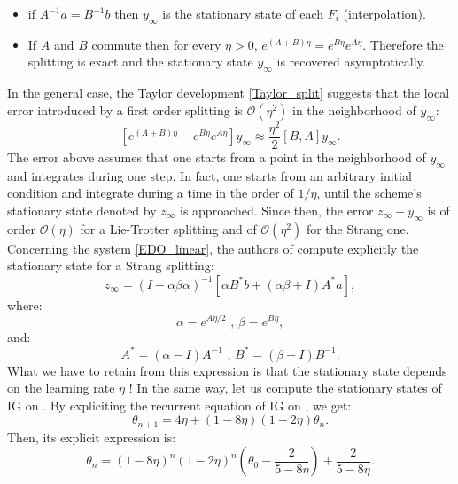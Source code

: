 \begin{itemize}
	\item if $A^{-1}a=B^{-1}b$  then $y_{\infty}$ is the stationary state of each $F_i$ (interpolation).
	\item If $A$ and $B$ commute then for every $\eta>0$, $e^{(A+B)\eta}=e^{B\eta}e^{A\eta}$. Therefore the splitting is exact and the stationary state $y_{\infty}$ is recovered asymptotically. 
\end{itemize}
In the general case, the Taylor development \eqref{Taylor_split} suggests that the local error introduced by a first order splitting is $\mathcal{O}(\eta^2)$ in the neighborhood of $y_{\infty}$:
\begin{equation*}
	\left[e^{(A+B)\eta}-e^{B\eta}e^{A\eta}\right]y_{\infty} \approx \frac{\eta^2}{2}\left[B,A\right]y_{\infty}.
\end{equation*}
The error above assumes that one starts from a point in the neighborhood of $y_{\infty}$ and integrates during one step. In fact, one starts from an arbitrary initial condition and
integrate during a time in the order of $1/\eta$, until the scheme's stationary state denoted by $z_{\infty}$ is approached. Since then, the error $z_{\infty}-y_{\infty}$ is of order $\mathcal{O}(\eta)$ for a Lie-Trotter splitting and of $\mathcal{O}(\eta^2)$ for the Strang one. Concerning the system \eqref{EDO_linear}, the authors of \cite{rebalanced_splitting} compute explicitly the stationary state for a Strang splitting:
\begin{equation*}
	z_{\infty} = (I-\alpha\beta\alpha)^{-1}\left[\alpha B^*b + (\alpha\beta+I)A^*a\right],
\end{equation*}
where:
\begin{equation*}
	\alpha = e^{A\eta/2} \text{ , } \beta = e^{B\eta},
\end{equation*}
and:
\begin{equation*}
	A^* = (\alpha-I)A^{-1} \text{ , } B^* = (\beta-I) B^{-1}.
\end{equation*}
What we have to retain from this expression is that the stationary state depends on the learning rate $\eta$ ! In the same way, let us compute the stationary states of IG on \exOne. By expliciting the recurrent equation of IG on \exOne, we get:
\begin{equation*}
	\theta_{n+1} = 4\eta + (1-8\eta)(1-2\eta)\theta_n.
\end{equation*} 
Then, its explicit expression is:
\begin{equation*}
	\theta_n = (1-8\eta)^n(1-2\eta)^n\left(\theta_0-\dfrac{2}{5-8\eta}\right) + \dfrac{2}{5-8\eta}.
\end{equation*}
